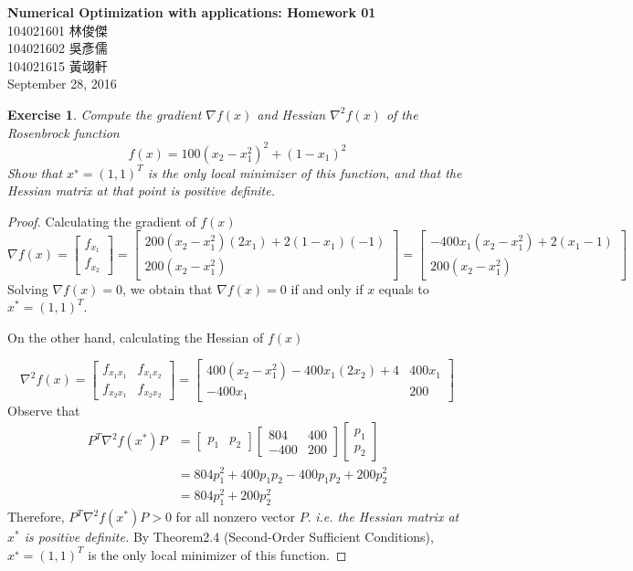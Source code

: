 \documentclass[11pt,a4paper]{article}
\renewcommand{\(}{\left(}
\renewcommand{\)}{\right)}
\renewcommand{\title}{Numerical Optimization with applications: Homework 01}
\renewcommand{\author}{104021601 林俊傑\\104021602 吳彥儒\\104021615 黃翊軒}
\renewcommand{\maketitle}{\begin{center}\textbf{\Large\title}\\[6pt] {\author}\\[6pt] {\color{Gray}\footnotesize September 28, 2016}\end{center}}
\newtheorem{exercise}{Exercise}
\begin{document}
  \maketitle

  \setcounter{exercise}{0}
  
  \begin{exercise}
  	Compute the gradient $\nabla f(x)$ and Hessian $\nabla^2 f(x)$ of the Rosenbrock function \[f (x) = 100(x_2 − x_1^2)^2 + (1 − x_1 )^2 \]Show that $x^∗ = (1,1)^T$ is the only local minimizer of this function, and that the Hessian 	matrix at that point is positive definite.
  \end{exercise}  
  \begin{proof}
  	Calculating the gradient of $f(x)$
  	$$\nabla f(x)=
  	\begin{bmatrix}
  	f_{x_1}\\ 
  	f_{x_2}
  \end{bmatrix}	=
  \begin{bmatrix}
  	200(x_2-x_1^2)(2x_1)+2(1-x_1)(-1)\\ 
  	200(x_2-x_1^2)
  \end{bmatrix}=
  \begin{bmatrix}
	  -400x_1(x_2-x_1^2)+2(x_1-1)\\ 
	  200(x_2-x_1^2)
  \end{bmatrix}
    $$
    Solving $\nabla f(x)=0$, we obtain that $\nabla f(x)=0$ if and only if $x$ equals to $x^*=(1,1)^T$.
  
    On the other hand, calculating the Hessian of $f(x)$
  
    $$\nabla^2 f(x)
    =
    \begin{bmatrix}
    f_{x_1x_1} & f_{x_1x_2}\\ 
    f_{x_2x_1} & f_{x_2x_2}
    \end{bmatrix}
    =
    \begin{bmatrix}
	  400(x_2-x_1^2)-400x_1(2x_2)+4 & 400x_1\\ 
	  -400x_1 & 200
    \end{bmatrix}
    $$
    Observe that
    \begin{align*}
    P^T\nabla^2 f(x^*)P
    &=
    \begin{bmatrix}
    p_1& p_2
    \end{bmatrix}
    \begin{bmatrix}
    804&400 \\ 
    -400&200 
    \end{bmatrix}
    \begin{bmatrix}
    p_1 \\ 
    p_2 
    \end{bmatrix}\\
    &=804p_1^2+400p_1p_2-400p_1p_2+200p_2^2 \\
    &=804p_1^2+200p_2^2 
    \end{align*}
    Therefore, $P^T\nabla^2 f(x^*)P > 0$ for all nonzero vector $P$. \textit{ i.e. the Hessian matrix at $x^*$ is positive definite.} By Theorem2.4 (Second-Order Sufficient Conditions),  $x^∗ = (1,1)^T$ is the only local minimizer of this function.
  \end{proof}
  
\end{document}
